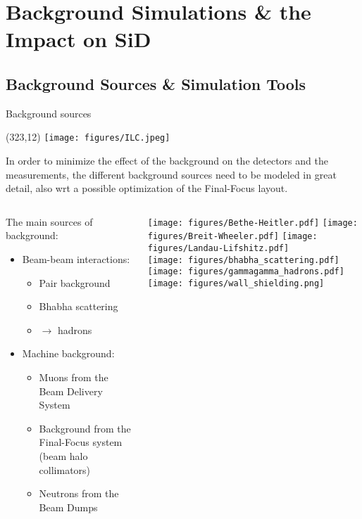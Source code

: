\documentclass[xcolor={dvipsnames}]{beamer}
\newcommand{\ilclogo}{
  \setlength{\TPHorizModule}{1pt}
  \setlength{\TPVertModule}{1pt}
  \begin{textblock}{1}(323,12)
   \texttt{[image: figures/ILC.jpeg]}
  \end{textblock}
}
\begin{document}
\section{Background Simulations \& the Impact on SiD}

\subsection{Background Sources \& Simulation Tools}
\begin{frame}{Background sources}
\ilclogo
\begin{block}{}
In order to minimize the effect of the background on the detectors and the measurements, the different background sources need to be modeled in great detail, also wrt a possible optimization of the Final-Focus layout.
\end{block}
\begin{columns}
 \begin{column}{0.65\textwidth}
 The main sources of background:
  \begin{itemize}
    \item Beam-beam interactions:
    \begin{itemize}
      \item Pair background
      \item Bhabha scattering
      \item \textgamma \textgamma $\rightarrow$ hadrons
    \end{itemize}
    \vspace*{0.3cm}
    \item Machine background:
    \begin{itemize}
      \item Muons from the Beam Delivery System
      \item Background from the Final-Focus system (beam halo collimators)
      \item Neutrons from the Beam Dumps
    \end{itemize}
  \end{itemize}
 \end{column}
 \begin{column}{0.4\textwidth}
 \begin{center}
 \texttt{[image: figures/Bethe-Heitler.pdf]}
 \texttt{[image: figures/Breit-Wheeler.pdf]}
 \texttt{[image: figures/Landau-Lifshitz.pdf]}\\
 \texttt{[image: figures/bhabha\_scattering.pdf]} 
 \texttt{[image: figures/gammagamma\_hadrons.pdf]}\\
 \vspace*{0.3cm}
 \texttt{[image: figures/wall\_shielding.png]}  
 \end{center}
 \end{column}
\end{columns}
\end{frame}
\end{document}
